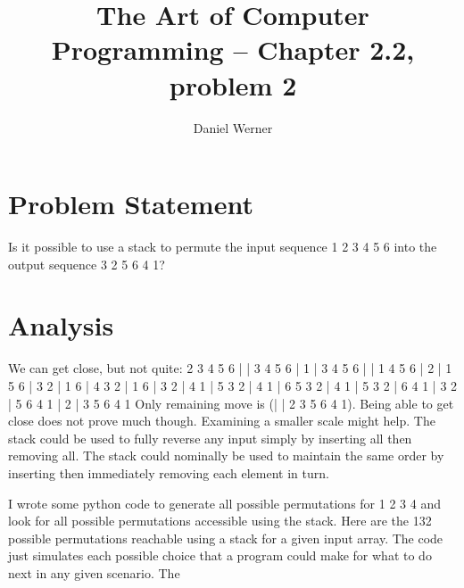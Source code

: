 \documentclass{article}
\title{The Art of Computer Programming -- Chapter 2.2, problem 2}
\author{Daniel Werner}
\begin{document}
\maketitle

\section*{
    Problem Statement
}

Is it possible to use a stack to permute the input sequence 1 2 3 4 5 6 into the output sequence 3 2 5 6 4 1?

\section*{
    Analysis
}

We can get close, but not quite:
 2 3 4 5 6 | |
 3 4 5 6 | 1 |
 3 4 5 6 | | 1
 4 5 6 | 2 | 1
 5 6 | 3 2 | 1
 6 | 4 3 2 | 1
 6 | 3 2 | 4 1
 | 5 3 2 | 4 1
\newline
| 6 5 3 2 | 4 1
\newline
| 5 3 2 | 6 4 1
\newline
| 3 2 | 5 6 4 1
\newline
| 2 | 3 5 6 4 1
\newline
Only remaining move is (| | 2 3 5 6 4 1). Being able to get close does not prove much though.  Examining a smaller scale might help.  The stack could be used to fully reverse any input simply by inserting all then removing all.  The stack could nominally be used to maintain the same order by inserting then immediately removing each element in turn.

\par
I wrote some python code to generate all possible permutations for 1 2 3 4 and look for all possible permutations accessible using the stack.  Here are the 132 possible permutations reachable using a stack for a given input array.  The code just simulates each possible choice that a program could make for what to do next in any given scenario.  The
\end{document}
